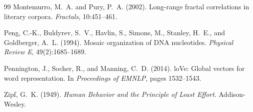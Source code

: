 \documentclass[12pt,a4paper]{article}
\begin{document}
\begin{thebibliography}{99}
Montemurro, M.~A. and Pury, P.~A. (2002).
\newblock Long-range fractal correlations in literary corpora.
\newblock \emph{Fractals}, 10:451--461.

Peng, C.-K., Buldyrev, S.~V., Havlin, S., Simons, M., Stanley,
  H.~E., and Goldberger, A.~L. (1994).
\newblock Mosaic organization of {DNA} nucleotides.
\newblock \emph{Physical Review E}, 49(2):1685--1689.

Pennington, J., Socher, R., and Manning, C.~D. (2014).
lo{V}e: Global vectors for word representation.
\newblock In \emph{Proceedings of EMNLP}, pages 1532--1543.

Zipf, G.~K. (1949).
\newblock \emph{Human Behavior and the Principle of Least Effort}.
\newblock Addison-Wesley.

\end{thebibliography}
\end{document}
